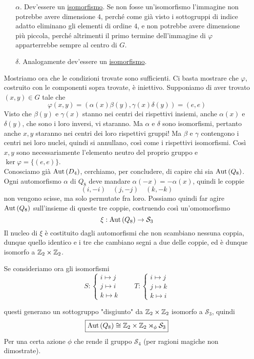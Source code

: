 \begin{multicols}{2}
\begin{itemize}
	 \item [$ \alpha $.] Dev'essere un \underline{isomorfismo}. Se non fosse un'isomorfismo l'immagine non potrebbe avere dimensione $ 4 $, perché come già visto i sottogruppi di indice adatto eliminano gli elementi di ordine $ 4 $, e non potrebbe avere dimensione più piccola, perché altrimenti il primo termine dell'immagine di $ \varphi $ apparterrebbe sempre al centro di $ G $.
	 
	 \item [$ \delta $.] Analogamente dev'essere un \underline{isomorfismo}. 
	\end{itemize}
Mostriamo ora che le condizioni trovate sono sufficienti. Ci basta mostrare che $ \varphi $, costruito con le componenti sopra trovate, è iniettivo. Supponiamo di aver trovato $ (x, y) \in G $ tale che
\[ \varphi(x, y) = (\alpha(x)\beta(y), \gamma(x)\delta(y)) = (e, e) \]
Visto che $ \beta(y) $ e $ \gamma(x) $ stanno nei centri dei rispettivi insiemi, anche $ \alpha(x) $ e $ \delta(y) $, che sono i loro inversi, vi staranno. Ma $ \alpha $ e $ \delta $ sono isomorfismi, pertanto anche $ x, y $ staranno nei centri dei loro rispettivi gruppi! Ma $ \beta $ e $ \gamma $ contengono i centri nei loro nuclei, quindi si annullano, così come i rispettivi isomorfismi. Così $ x, y $ sono necessariamente l'elemento neutro del proprio gruppo e $ \ker\varphi = \{(e, e)\} $. \\

Conosciamo già $ \mathrm{Aut}\left( D_4 \right) $, cerchiamo, per concludere, di capire chi sia{\tiny } $ \mathrm{Aut}\left( Q_8 \right) $. \\

Ogni automorfismo $ \alpha $ di $ Q_8 $ deve mandare $ \alpha(-x) = -\alpha(x) $, quindi le coppie 
\[ (i, -i) \quad (j, -j) \quad (k, -k) \]
non vengono scisse, ma solo permutate fra loro. Possiamo quindi far agire $ \mathrm{Aut}\left( Q_8 \right) $ sull'insieme di queste tre coppie, costruendo così un'omomorfismo
\[ \xi : \mathrm{Aut}\left( Q_8 \right) \to \mathcal{S}_3 \]
Il nucleo di $ \xi $ è costituito dagli automorfismi che non scambiano nessuna coppia, dunque quello identico e i tre che cambiano segni a due delle coppie, ed è dunque isomorfo a $ \mathbb{Z}_2 \times \mathbb{Z}_2 $.

Se consideriamo ora gli isomorfismi
\[ S: \begin{cases}
i \mapsto j \\ j \mapsto i \\ k \mapsto k
\end{cases}
\qquad T: \begin{cases}
i \mapsto j\\
j \mapsto k\\
k \mapsto i
\end{cases} \]


questi generano un sottogruppo "disgiunto" da $ \mathbb{Z}_2 \times \mathbb{Z}_2 $ isomorfo a $ \mathcal{S}_3 $, quindi
\[ \boxed{\mathrm{Aut}\left( Q_8 \right) \cong \mathbb{Z}_2 \times \mathbb{Z}_2 \rtimes_\phi \mathcal{S}_3} \] Per una certa azione $ \phi $ che rende il gruppo $ \mathcal{S}_4 $ (per ragioni magiche non dimostrate).




\end{multicols}


